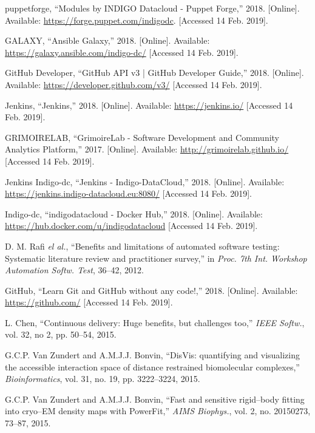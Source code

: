 \begin{thebibliography}{1}
puppetforge, ``Modules by INDIGO Datacloud - Puppet Forge,''
2018.
[Online]. Available: \url{https://forge.puppet.com/indigodc}.
[Accessed 14 Feb. 2019].

GALAXY, ``Ansible Galaxy,''
2018.
[Online]. Available: \url{https://galaxy.ansible.com/indigo-dc/}
[Accessed 14 Feb. 2019].

GitHub Developer, ``GitHub API v3 | GitHub Developer Guide,''
2018.
[Online]. Available: \url{https://developer.github.com/v3/}
[Accessed 14 Feb. 2019].


Jenkins, ``Jenkins,''
2018.
[Online]. Available: \url{https://jenkins.io/}
[Accessed 14 Feb. 2019].

GRIMOIRELAB, ``GrimoireLab - Software Development and Community Analytics Platform,''
2017.
[Online]. Available: \url{http://grimoirelab.github.io/}
[Accessed 14 Feb. 2019].

Jenkins Indigo-dc, ``Jenkins - Indigo-DataCloud,''
2018.
[Online]. Available: \url{https://jenkins.indigo-datacloud.eu:8080/}
[Accessed 14 Feb. 2019].

Indigo-dc, ``indigodatacloud - Docker Hub,''
2018.
[Online]. Available: \url{https://hub.docker.com/u/indigodatacloud}
[Accessed 14 Feb. 2019].

D. M. Rafi \emph{el al.},
``Benefits and limitations of automated software testing: Systematic literature review and practitioner survey,''
in \emph{Proc. 7th Int. Workshop Automation Softw. Test},
36--42, 2012.


GitHub, ``Learn Git and GitHub without any code!,''
2018.
[Online]. Available: \url{https://github.com/}
[Accessed 14 Feb. 2019].

L. Chen,
``Continuous delivery: Huge benefits, but challenges too,''
\emph{IEEE Softw.},
vol. 32, no 2, pp. 50--54, 2015.



G.C.P. Van Zundert and A.M.J.J. Bonvin,
``DisVis: quantifying and visualizing the accessible interaction space of distance
restrained biomolecular complexes,''
\emph{Bioinformatics}, vol. 31, no. 19, pp. 3222--3224, 2015.


G.C.P. Van Zundert and A.M.J.J. Bonvin,
``Fast and sensitive rigid--body fitting into cryo--EM density maps with PowerFit,''
\emph{AIMS Biophys.}, vol. 2, no. 20150273, 73--87, 2015.

\end{thebibliography}

